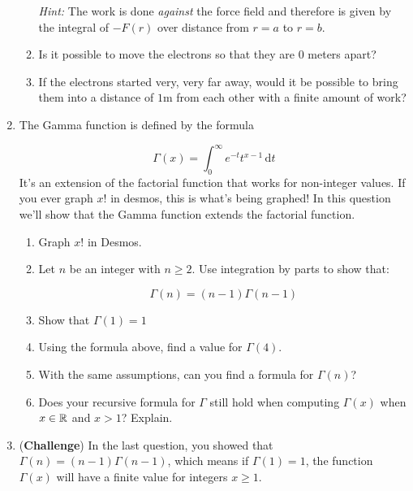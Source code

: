 \begin{enumerate}
\begin{enumerate}
        \emph{Hint:} The work is done \textit{against} the force field and therefore is given by the integral of $-F(r)$ over distance from $r=a$ to $r=b$.%
        \item Is it possible to move the electrons so that they are $0$ meters apart?
        \item If the electrons started very, very far away, would it be possible to bring them into a distance of $1$m from each other with a 
        finite amount of work?
    \end{enumerate}



\item The Gamma function is defined by the formula 

    \[
        \Gamma(x) = \int_0^\infty e^{-t}t^{x-1}\,\mathrm dt
    \]
    It's an extension of the factorial function that works for non-integer values. If you ever graph $x!$ in desmos, this is what's being graphed! In this question we'll show that the Gamma function extends the factorial function.
   \begin{enumerate}
        \item Graph $x!$ in Desmos.
    
        \item Let $n$ be an integer with $n\geq 2$. Use integration by parts to show that:

        \[
            \Gamma(n) = (n-1)\Gamma(n-1)
        \]

        \item Show that $\Gamma(1) = 1$

        \item Using the formula above, find a value for $\Gamma(4)$.
        

        
        \item With the same assumptions, can you find a formula for $\Gamma(n)$?
        \item Does your recursive formula for $\Gamma$ still hold
        when computing $\Gamma(x)$ when $x\in \mathbb{R}$ and $x>1$? Explain.
    \end{enumerate}    

\item (\textbf{Challenge}) In the last question, you showed that $\Gamma(n)=(n-1)\Gamma(n-1)$, which means if $\Gamma(1)=1$, the function $\Gamma(x)$ will have a finite value for integers $x\geq 1$.



\end{enumerate}
